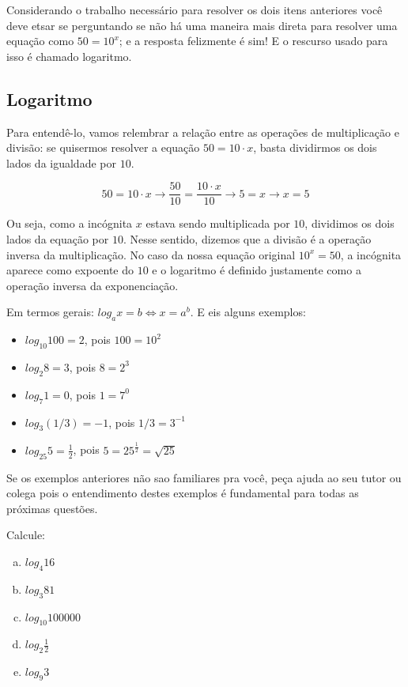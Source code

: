 \documentclass[main_estudante.tex]{subfiles}
\begin{document}
Considerando o trabalho necessário para resolver os dois itens anteriores você deve etsar se perguntando se não há uma maneira mais direta para resolver uma equação como $50=10^x$; e a resposta felizmente é sim! E o rescurso usado para isso é chamado logaritmo.

\subsection*{Logaritmo}

Para entendê-lo, vamos relembrar a relação entre as operações de multiplicação e divisão: se quisermos resolver a equação $50=10 \cdot x$, basta dividirmos os dois lados da igualdade por $10$.

$$
50=10 \cdot x \longrightarrow \frac{50}{10}=\frac{10 \cdot x}{10} \longrightarrow 5=x \longrightarrow x=5
$$

Ou seja, como a incógnita $x$ estava sendo multiplicada por $10$, dividimos os dois lados da equação por $10$. Nesse sentido, dizemos que a divisão é a operação inversa da multiplicação. No caso da nossa equação original $10^x=50$, a incógnita aparece como expoente do $10$ e o logaritmo é definido justamente como a operação inversa da exponenciação.

\begin{shaded*}
Em termos gerais: $log_a x = b \Leftrightarrow x=a^b$. E eis alguns exemplos:

\begin{itemize}
 \item $log_{10} 100 = 2$, pois $100=10^2$
 \item $log_2 8 = 3$, pois $8=2^3$
 \item $log_7 1 = 0$, pois $1=7^0$
 \item $log_3 (1/3) = -1$, pois $1/3=3^{-1}$
 \item $log_{25} 5 = \frac{1}{2}$, pois $5=25^{\frac{1}{2}}=\sqrt{25}$
\end{itemize}
\end{shaded*}

Se os exemplos anteriores não sao familiares pra você, peça ajuda ao seu tutor ou colega pois o entendimento destes exemplos é fundamental para todas as próximas questões.

\begin{questao}
Calcule:
\begin{enumerate}[a)]
\item $log_4 16$
\item $log_3 81$
\item $log_{10} 100000$
\item $log_2 \frac{1}{2}$
\item $log_9 3$
\end{enumerate}
\end{questao}
\end{document}

